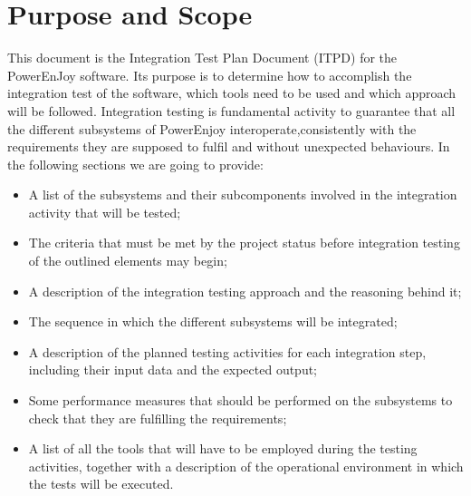 \section{Purpose and Scope}
This document is the Integration Test Plan Document (ITPD) for the PowerEnJoy
software. Its purpose is to determine how to accomplish the
integration test of the software, which tools need to be used and which approach
will be followed.
Integration testing is fundamental activity to guarantee that all the different subsystems of PowerEnjoy interoperate,consistently with the requirements they are supposed to fulfil and without unexpected behaviours.
In the following sections we are going to provide:
\begin{itemize}
\item A list of the subsystems and their subcomponents involved in the integration activity that will be tested;
\item The criteria that must be met by the project status before integration testing of the outlined elements may begin;
\item A description of the integration testing approach and the reasoning behind it;
\item The sequence in which the different subsystems will be integrated;
\item A description of the planned testing activities for each integration step, including their input data and the expected output;
\item Some performance measures that should be performed on the subsystems to check that they are fulfilling the requirements;
\item A list of all the tools that will have to be employed during the testing activities, together with a description of the operational environment in which the tests will be executed.
\end{itemize} 
